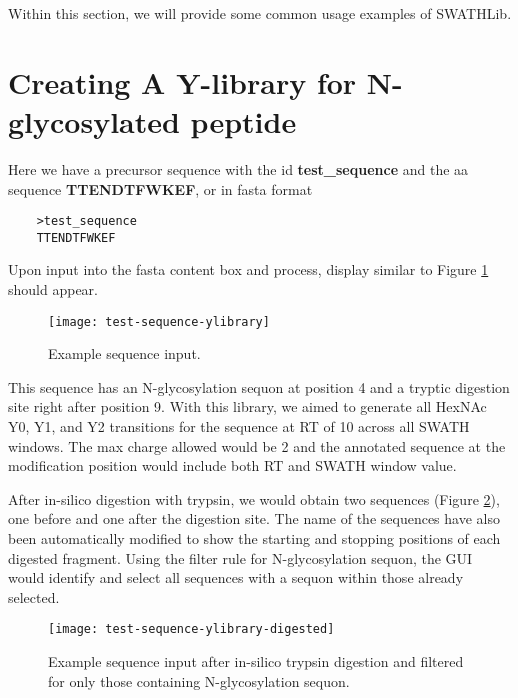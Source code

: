 \documentclass[../manual.tex]{subfiles}
\begin{document}
Within this section, we will provide some common usage examples of SWATHLib.

\section{Creating A Y-library for N-glycosylated peptide}
Here we have a precursor sequence with the id \textbf{test\_sequence} and the aa sequence \textbf{TTENDTFWKEF}, or in fasta format \par
\begin{verbatim}
	>test_sequence
	TTENDTFWKEF
\end{verbatim}

Upon input into the fasta content box and process, display similar to Figure \ref{fig:testsequenceylibrary} should appear.

\begin{figure}[h]
	\centering
	\begin{framed}
        \centering
        \begin{adjustbox}{width=1\textwidth}
			\texttt{[image: test-sequence-ylibrary]}
		\end{adjustbox}
		\caption{Example sequence input.}\label{fig:testsequenceylibrary}
	\end{framed}
\end{figure}


This sequence has an N-glycosylation sequon at position 4 and a tryptic digestion site right after position 9. With this library, we aimed to generate all HexNAc Y0, Y1, and Y2 transitions for the sequence at RT of 10 across all SWATH windows. The max charge allowed would be 2 and the annotated sequence at the modification position would include both RT and SWATH window value.\par


After in-silico digestion with trypsin, we would obtain two sequences (Figure \ref{fig:testsequenceylibrarydigested}), one before and one after the digestion site. The name of the sequences have also been automatically modified to show the starting and stopping positions of each digested fragment. Using the filter rule for N-glycosylation sequon, the GUI would identify and select all sequences with a sequon within those already selected.
\begin{figure}[h]
	\centering
	\begin{framed}
        \centering
        \begin{adjustbox}{width=1\textwidth}
			\texttt{[image: test-sequence-ylibrary-digested]}
		\end{adjustbox}
		\caption{Example sequence input after in-silico trypsin digestion and filtered for only those containing N-glycosylation sequon.}\label{fig:testsequenceylibrarydigested}
	\end{framed}
\end{figure}
\end{document}
